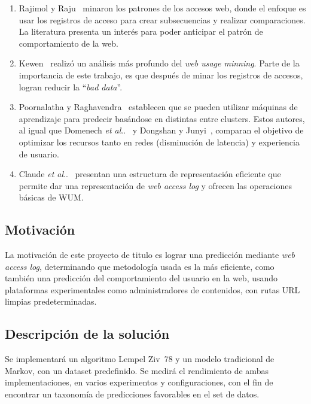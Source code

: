 \documentclass{udparticle}
\makeatletter
\DeclareRobustCommand\onedot{\futurelet\@let@token\@onedot}
\newcommand\@onedot{\ifx\@let@token.\else.\null\fi\xspace}
\newcommand\etal{\emph{et al}\onedot}
\makeatother
\begin{document}
\begin{enumerate}
  \item Rajimol y Raju~\cite{rajimol2012} minaron los patrones de los accesos web, donde el enfoque es usar los registros de acceso para crear subsecuencias y realizar comparaciones.
  La literatura presenta un interés para poder anticipar el patrón de comportamiento de la web.

  \item Kewen~\cite{kewen2012} realizó un análisis más profundo del \emph{web usage minning}.
  Parte de la importancia de este trabajo, es que después de minar los registros de accesos, logran reducir la ``\emph{bad data}''.

  \item Poornalatha y Raghavendra~\cite{Poornalatha2012} establecen que se pueden utilizar máquinas de aprendizaje para predecir basándose en distintas entre clusters. Estos autores, al igual que Domenech \etal~\cite{Domenech2006} y Dongshan y Junyi~\cite{Dongshan2002}, comparan el objetivo de optimizar los recursos tanto en redes (disminución de latencia) y experiencia de usuario.

  \item Claude \etal~\cite{Claude2014} presentan una estructura de representación eficiente que permite dar una representación de \emph{web access log} y ofrecen las operaciones básicas de WUM.
\end{enumerate}


\subsection{Motivación}

La motivación de este proyecto de titulo es lograr una predicción mediante \emph{web access log}, determinando que metodología usada es la más eficiente, como también una predicción del comportamiento del usuario en la web, usando plataformas experimentales como administradores de contenidos, con rutas URL limpias predeterminadas.


\subsection{Descripción de la solución }

Se implementará un algoritmo Lempel Ziv~78 y un modelo tradicional de Markov, con un dataset predefinido.
Se medirá el rendimiento de ambas implementaciones, en varios experimentos y configuraciones, con el fin de encontrar un taxonomía de predicciones favorables en el set de datos.
\end{document}
